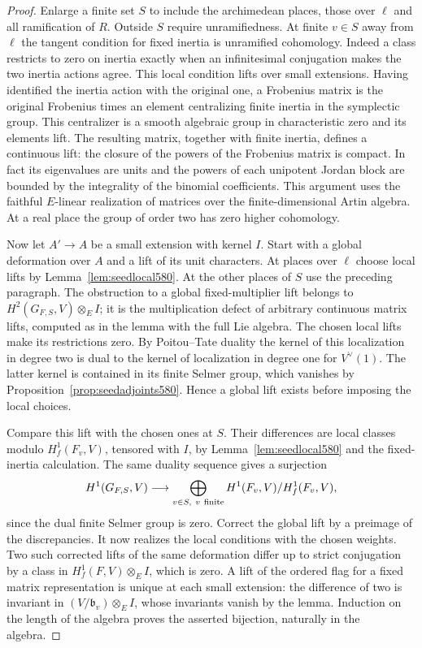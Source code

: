 \documentclass[a4paper,11pt]{article}
\theoremstyle{definition}
\theoremstyle{remark}
\numberwithin{equation}{section}
\begin{document}
\begin{proof}
Enlarge a finite set \(S\) to include the archimedean places,
those over \(\ell\) and all ramification of \(R\). Outside \(S\)
require unramifiedness. At finite \(v\in S\) away from \(\ell\)
the tangent condition for fixed inertia is unramified cohomology.
Indeed a class restricts to zero on inertia exactly when an
infinitesimal conjugation makes the two inertia actions agree.
This local condition lifts over small extensions. Having
identified the inertia action with the original one, a Frobenius
matrix is the original Frobenius times an element centralizing
finite inertia in the symplectic group. This centralizer is a
smooth algebraic group in characteristic zero and its elements
lift. The resulting matrix, together with finite inertia, defines
a continuous lift: the closure of the powers of the Frobenius
matrix is compact. In fact its eigenvalues are units and the
powers of each unipotent Jordan block are bounded by the
integrality of the binomial coefficients. This argument uses
the faithful \(E\)-linear realization of matrices over the
finite-dimensional Artin algebra. At a real place the group
of order two has zero higher cohomology.

Now let \(A'\to A\) be a small extension with kernel \(I\).
Start with a global deformation over \(A\) and a lift of its
unit characters. At places over \(\ell\) choose local lifts
by Lemma~\ref{lem:seedlocal580}. At the other places of \(S\)
use the preceding paragraph. The obstruction to a global
fixed-multiplier lift belongs to \(H^2(G_{F,S},V)\otimes_E I\);
it is the multiplication defect of arbitrary continuous matrix
lifts, computed as in the lemma with the full Lie algebra.
The chosen local lifts make its restrictions zero. By
Poitou--Tate duality the kernel of this localization in degree
two is dual to the kernel of localization in degree one for
\(V^\vee(1)\). The latter kernel is contained in its finite
Selmer group, which vanishes by Proposition~\ref{prop:seedadjoints580}.
Hence a global lift exists before imposing the local choices.

Compare this lift with the chosen ones at \(S\). Their
differences are local classes modulo \(H^1_f(F_v,V)\), tensored
with \(I\), by Lemma~\ref{lem:seedlocal580} and the fixed-inertia
calculation. The same duality sequence gives a surjection
\[
 H^1(G_{F,S},V)\longrightarrow
 \bigoplus_{v\in S,\ v\ {\rm finite}}
       H^1(F_v,V)/H^1_f(F_v,V),
\]
since the dual finite Selmer group is zero. Correct the global
lift by a preimage of the discrepancies. It now realizes the
local conditions with the chosen weights. Two such corrected
lifts of the same deformation differ up to strict conjugation
by a class in \(H^1_f(F,V)\otimes_E I\), which is zero. A lift
of the ordered flag for a fixed matrix representation is unique
at each small extension: the difference of two is invariant in
\((V/\mathfrak b_v)\otimes_E I\), whose invariants vanish by the
lemma. Induction on the length of the algebra proves the asserted
bijection, naturally in the algebra.


\end{proof}
\end{document}
